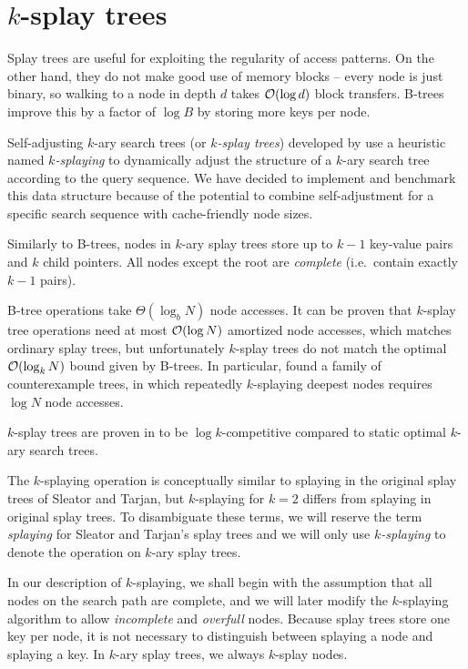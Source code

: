 \chapter{$k$-splay trees}
\label{chapter:ksplay}
Splay trees are useful for exploiting the regularity of access patterns.
On the other hand, they do not make good use of memory blocks -- every node
is just binary, so walking to a node in depth $d$ takes $\mathcal{O}(\log d)$ block
transfers. B-trees improve this by a factor of $\log B$ by storing more keys
per node.

Self-adjusting $k$-ary search trees (or \emph{$k$-splay trees}) developed
by \cite{ksplay-sherk} use a heuristic named \emph{$k$-splaying}
to dynamically adjust the structure of a $k$-ary search tree according to
the query sequence. We have decided to implement and benchmark this data
structure because of the potential to combine self-adjustment for a specific
search sequence with cache-friendly node sizes.

Similarly to B-trees, nodes in $k$-ary splay trees store up to $k-1$ key-value
pairs and $k$ child pointers. All nodes except the root are \emph{complete}
(i.e.\ contain exactly $k-1$ pairs).

B-tree operations take $\Theta(\log_b N)$ node accesses. It can be proven that
$k$-splay tree operations need at most $\mathcal{O}(\log N)$ amortized node accesses,
which matches ordinary splay trees, but unfortunately $k$-splay trees
do not match the optimal $\mathcal{O}(\log_k N)$ bound given by B-trees. In particular,
\cite{ksplay-nonopt} found a family of counterexample trees, in which
repeatedly $k$-splaying deepest nodes requires $\log N$ node accesses.

$k$-splay trees are proven in \cite{ksplay-sherk} to be $\log k$-competitive
compared to static optimal $k$-ary search trees.

The $k$-splaying operation is conceptually similar to splaying in the original
splay trees of Sleator and Tarjan, but $k$-splaying for $k=2$ differs from
splaying in original splay trees. To disambiguate these terms, we will
reserve the term \emph{splaying} for Sleator and Tarjan's splay trees and
we will only use \emph{$k$-splaying} to denote the operation
on $k$-ary splay trees.

In our description of $k$-splaying, we shall begin with the assumption that
all nodes on the search path are complete, and we will later modify
the $k$-splaying algorithm to allow \emph{incomplete} and \emph{overfull}
nodes.
Because splay trees store one key per node, it is not necessary to distinguish
between splaying a node and splaying a key. In $k$-ary splay trees, we always
$k$-splay nodes.

